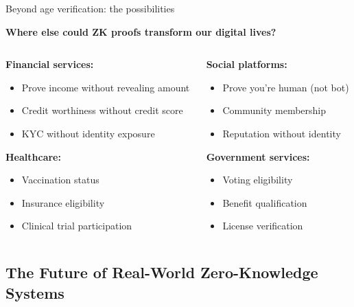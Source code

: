 \documentclass[aspectratio=169, lualatex, handout]{beamer}
\begin{document}
\begin{frame}{Beyond age verification: the possibilities}
	\begin{center}
		\textbf{Where else could ZK proofs transform our digital lives?}
	\end{center}
	\vspace{0.5em}
	\begin{columns}[c]
		\begin{column}{0.5\textwidth}
			\textbf{Financial services:}
			\begin{itemize}
				\item Prove income without revealing amount
				\item Credit worthiness without credit score
				\item KYC without identity exposure
			\end{itemize}
			\vspace{0.5em}
			\textbf{Healthcare:}
			\begin{itemize}
				\item Vaccination status
				\item Insurance eligibility
				\item Clinical trial participation
			\end{itemize}
		\end{column}
		\begin{column}{0.5\textwidth}
			\textbf{Social platforms:}
			\begin{itemize}
				\item Prove you're human (not bot)
				\item Community membership
				\item Reputation without identity
			\end{itemize}
			\vspace{0.5em}
			\textbf{Government services:}
			\begin{itemize}
				\item Voting eligibility
				\item Benefit qualification
				\item License verification
			\end{itemize}
		\end{column}
	\end{columns}
\end{frame}

\subsection{The Future of Real-World Zero-Knowledge Systems}
\end{document}
